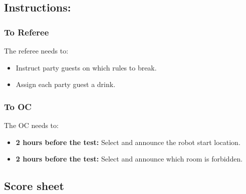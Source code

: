 \subsection*{Instructions:}
\subsubsection*{To Referee}

The referee needs to:
\begin{itemize}
	\item Instruct party guests on which rules to break.
	\item Assign each party guest a drink.
\end{itemize}

\subsubsection*{To OC}
The OC needs to:
\begin{itemize}
	\item \textbf{2 hours before the test:} Select and announce the robot start location.
	\item \textbf{2 hours before the test:} Select and announce which room is forbidden.
\end{itemize}

\subsection*{Score sheet}



